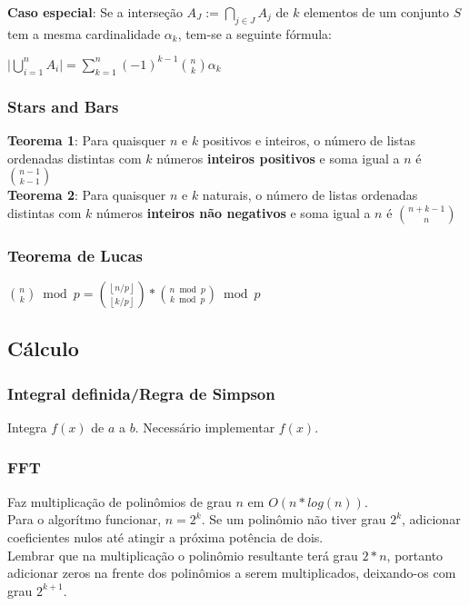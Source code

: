 \textbf{Caso especial}: Se a interseção $A_J:=\bigcap_{j\in J} A_j$ de $k$ elementos de um conjunto $S$ tem a mesma cardinalidade $\alpha_k$, tem-se a seguinte fórmula:

$\biggl| \bigcup_{i=1}^n A_i\biggr| = \sum_{k=1}^n (-1)^{k-1} {n \choose k} \alpha_k$

\divisor

\subsubsection{Stars and Bars}
\textbf{Teorema 1}: Para quaisquer $n$ e $k$ positivos e inteiros, o n\'{u}mero de listas ordenadas distintas com $k$ n\'{u}meros \textbf{inteiros positivos} e soma igual a $n$ \'{e} ${n-1 \choose k-1}$ \\

\textbf{Teorema 2}: Para quaisquer $n$ e $k$ naturais, o n\'{u}mero de listas ordenadas distintas com $k$ n\'{u}meros \textbf{inteiros n\~{a}o negativos} e soma igual a $n$ \'{e} ${n+k-1 \choose n}$

\divisor

\subsubsection{Teorema de Lucas}

${n \choose k} \bmod{p} = {\left \lfloor{n/p}\right \rfloor \choose \left \lfloor{k/p}\right \rfloor} * {n \bmod{p} \choose k \bmod{p}} \bmod{p}$




\subsection{Cálculo}

\subsubsection{Integral definida/Regra de Simpson}
Integra $f(x)$ de $a$ a $b$. Necessário implementar $f(x)$.

\divisor

\subsubsection{FFT}
Faz multiplica\c{c}\~{a}o de polin\^{o}mios de grau $n$ em $O(n*log(n))$.\\
Para o algor\'{i}tmo funcionar, $n=2^k$. Se um polin\^{o}mio n\~{a}o tiver grau $2^k$, adicionar coeficientes nulos at\'{e} atingir a pr\'{o}xima pot\^{e}ncia de dois.\\
Lembrar que na multiplica\c{c}\~{a}o o polin\^{o}mio resultante ter\'{a} grau $2*n$, portanto adicionar zeros na frente dos polin\^{o}mios a serem multiplicados, deixando-os com grau $2^{k+1}$.

